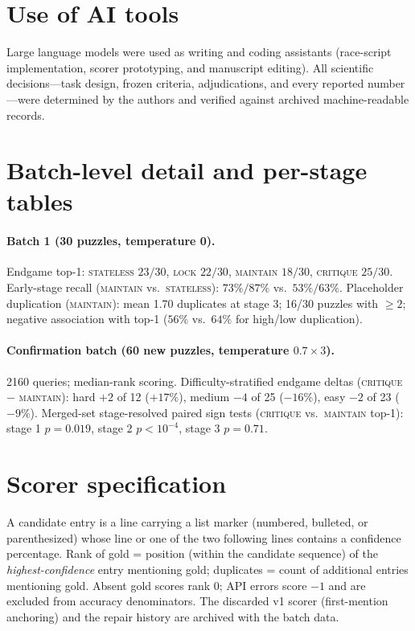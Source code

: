 \documentclass[10pt]{article}
\newcommand{\Mstate}{\textsc{stateless}}
\newcommand{\Mlock}{\textsc{lock}}
\newcommand{\Mmaint}{\textsc{maintain}}
\newcommand{\Mcrit}{\textsc{critique}}
\begin{document}
\section*{Use of AI tools}
Large language models were used as writing and coding assistants
(race-script implementation, scorer prototyping, and manuscript editing).
All scientific decisions---task design, frozen criteria, adjudications,
and every reported number---were determined by the authors and verified
against archived machine-readable records.




\appendix

\section{Batch-level detail and per-stage tables}
\label{app:tables}

\paragraph{Batch 1 (30 puzzles, temperature 0).}
Endgame top-1: \Mstate{} $23/30$, \Mlock{} $22/30$, \Mmaint{} $18/30$,
\Mcrit{} $25/30$. Early-stage recall (\Mmaint{} vs.\ \Mstate{}):
$73\%/87\%$ vs.\ $53\%/63\%$. Placeholder duplication (\Mmaint{}):
mean 1.70 duplicates at stage 3; 16/30 puzzles with $\ge 2$; negative
association with top-1 ($56\%$ vs.\ $64\%$ for high/low duplication).

\paragraph{Confirmation batch (60 new puzzles, temperature $0.7 \times 3$).}
2160 queries; median-rank scoring. Difficulty-stratified endgame deltas
(\Mcrit{} $-$ \Mmaint{}): hard $+2$ of 12 ($+17\%$), medium $-4$ of 25
($-16\%$), easy $-2$ of 23 ($-9\%$). Merged-set stage-resolved paired
sign tests (\Mcrit{} vs.\ \Mmaint{} top-1): stage 1 $p = 0.019$, stage 2
$p < 10^{-4}$, stage 3 $p = 0.71$.

\section{Scorer specification}
\label{app:scorer}

A candidate entry is a line carrying a list marker (numbered, bulleted,
or parenthesized) whose line or one of the two following lines contains a
confidence percentage. Rank of gold = position (within the candidate
sequence) of the \emph{highest-confidence} entry mentioning gold;
duplicates = count of additional entries mentioning gold. Absent gold
scores rank 0; API errors score $-1$ and are excluded from accuracy
denominators. The discarded v1 scorer (first-mention anchoring) and the
repair history are archived with the batch data.
\end{document}

